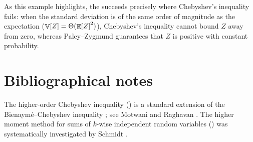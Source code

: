 \bigskip

As this example highlights, the  succeeds precisely where Chebyshev's inequality fails: when the standard deviation is of the same order of magnitude as the expectation ($\mathop{\mathbb{V}}\!\left[ {Z} \right] = \Theta(\mathop{\mathbb{E}}\!\left[ {Z} \right]^2)$), Chebyshev's inequality cannot bound $Z$ away from zero, whereas Paley--Zygmund guarantees that $Z$ is positive with constant probability.


\section{Bibliographical notes}

The higher-order Chebyshev inequality () is a
standard extension of the Bienaym{\'e}--Chebyshev inequality
\cite{b-cadld-1853, c-dvm-1867}; see Motwani and Raghavan
\cite[Chapter~3]{mr-ra-95}.  The higher moment method for sums of
$k$-wise independent random variables () was systematically
investigated by Schmidt \etal \cite{sss-chbal-95}.



{}


\ChapterEnd{}



